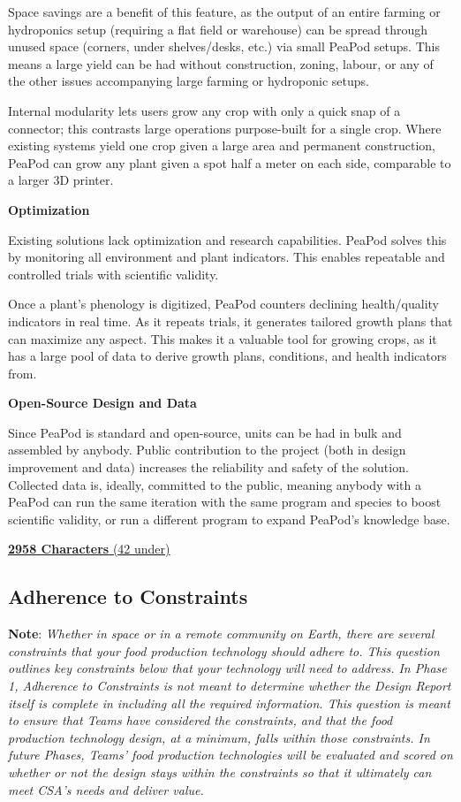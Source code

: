\documentclass{report}
\begin{document}
Space savings are a benefit of this feature, as the output of an entire farming or hydroponics setup (requiring a flat field or warehouse) can be spread through unused space (corners, under shelves/desks, etc.) via small PeaPod setups. This means a large yield can be had without construction, zoning, labour, or any of the other issues accompanying large farming or hydroponic setups.

Internal modularity lets users grow any crop with only a quick snap of a connector; this contrasts large operations purpose-built for a single crop. Where existing systems yield one crop given a large area and permanent construction, PeaPod can grow any plant given a spot half a meter on each side, comparable to a larger 3D printer.

\textbf{Optimization}

Existing solutions lack optimization and research capabilities. PeaPod solves this by monitoring all environment and plant indicators. This enables repeatable and controlled trials with scientific validity.

Once a plant's phenology is digitized, PeaPod counters declining health/quality indicators in real time. As it repeats trials, it generates tailored growth plans that can maximize any aspect. This makes it a valuable tool for growing crops, as it has a large pool of data to derive growth plans, conditions, and health indicators from.

\textbf{Open-Source Design and Data}

Since PeaPod is standard and open-source, units can be had in bulk and assembled by anybody. Public contribution to the project (both in design improvement and data) increases the reliability and safety of the solution. Collected data is, ideally, committed to the public, meaning anybody with a PeaPod can run the same iteration with the same program and species to boost scientific validity, or run a different program to expand PeaPod's knowledge base.

\uline{\textbf{2958 Characters} (42 under)}

\subsection{Adherence to Constraints}
\label{sec:constraints}

\textbf{Note}: \textit{Whether in space or in a remote community on Earth, there are several constraints that your food production technology should adhere to. This question outlines key constraints below that your technology will need to address. In Phase 1, Adherence to Constraints is not meant to determine whether the Design Report itself is complete in including all the required information. This question is meant to ensure that Teams have considered the constraints, and that the food production technology design, at a minimum, falls within those constraints. In future Phases, Teams’ food production technologies will be evaluated and scored on whether or not the design stays within the constraints so that it ultimately can meet CSA’s needs and deliver value.}
\end{document}
